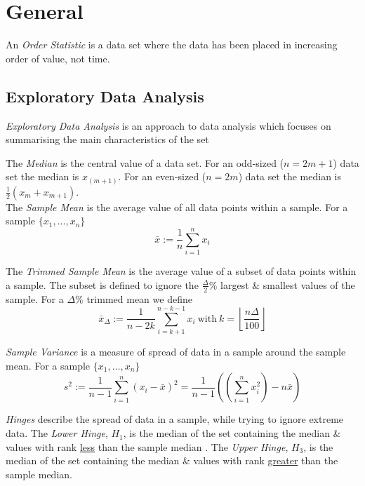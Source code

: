 \documentclass[11pt,a4paper]{article}
\begin{document}
\section{General}

An \textit{Order Statistic} is a data set where the data has been placed in increasing order of value, not time.

\subsection{Exploratory Data Analysis}

\textit{Exploratory Data Analysis} is an approach to data analysis which focuses on summarising the main characteristics of the set

The \textit{Median} is the central value of a data set. For an odd-sized ($n=2m+1$) data set the median is $x_{(m+1)}$. For an even-sized ($n=2m$) data set the median is $\frac{1}{2}(x_m+x_{m+1})$.\\

The \textit{Sample Mean} is the average value of all data points within a sample. For a sample $\{x_1,\dots,x_n\}$
$$\bar{x}:=\frac{1}{n}\sum_{i=1}^nx_i$$

The \textit{Trimmed Sample Mean} is the average value of a subset of data points within a sample. The subset is defined to ignore the $\frac{\Delta}{2}\%$ largest \& smallest values of the sample. For a $\Delta\%$ trimmed mean we define
$$\bar{x}_\Delta:=\frac{1}{n-2k}\sum_{i=k+1}^{n-k-1}x_i\ \mathrm{with}\ k=\left\lfloor\frac{n\Delta}{100}\right\rfloor$$

\textit{Sample Variance} is a measure of spread of data in a sample around the sample mean. For a sample $\{x_1,\dots,x_n\}$
$$s^2:=\frac{1}{n-1}\sum_{i=1}^n(x_i-\bar{x})^2=\frac{1}{n-1}\left(\left(\sum_{i=1}^nx_i^2\right)-n\bar{x}\right)$$

\textit{Hinges} describe the spread of data in a sample, while trying to ignore extreme data. The \textit{Lower Hinge}, $H_1$, is the median of the set containing the median \& values with rank \underline{less} than the sample median . The \textit{Upper Hinge}, $H_3$, is the median of the set containing the median \& values with rank \underline{greater} than the sample median.\\
\end{document}
